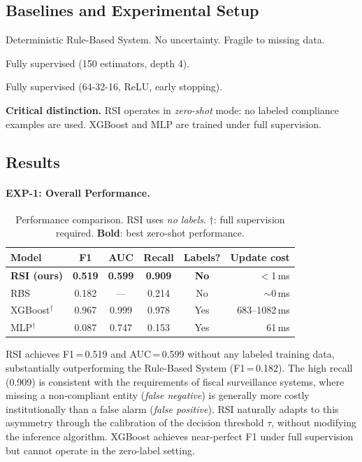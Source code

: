 \documentclass[letterpaper]{article}
\begin{document}
\subsection{Baselines and Experimental Setup}

\begin{description}[leftmargin=1.5em]
  \item[RBS] Deterministic Rule-Based System. No uncertainty.
        Fragile to missing data.
  \item[XGBoost] \citep{chen2016xgboost} Fully supervised
        (150 estimators, depth 4).
  \item[MLP] Fully supervised (64-32-16, ReLU, early stopping).
\end{description}

\noindent\textbf{Critical distinction.} RSI operates in
\emph{zero-shot} mode: no labeled compliance examples are used.
XGBoost and MLP are trained under full supervision.

\subsection{Results}

\paragraph{EXP-1: Overall Performance.}

\begin{table}[H]
\centering
\caption{Performance comparison. RSI uses \emph{no labels}.
         $\dagger$: full supervision required.
         \textbf{Bold}: best zero-shot performance.}
\label{tab:main}
\renewcommand{\arraystretch}{1.2}
\begin{tabular}{lccccr}
\toprule
\textbf{Model} & \textbf{F1} & \textbf{AUC} & \textbf{Recall}
  & \textbf{Labels?} & \textbf{Update cost} \\
\midrule
\textbf{RSI (ours)} & \textbf{0.519} & \textbf{0.599} & \textbf{0.909}
  & \textbf{No} & $<$1\,ms \\
RBS & 0.182 & --- & 0.214 & No & $\sim$0\,ms \\
XGBoost$^\dagger$ & 0.967 & 0.999 & 0.978 & Yes & 683--1082\,ms \\
MLP$^\dagger$ & 0.087 & 0.747 & 0.153 & Yes & 61\,ms \\
\bottomrule
\end{tabular}
\end{table}

RSI achieves F1\,=\,0.519 and AUC\,=\,0.599 without any labeled
training data, substantially outperforming the Rule-Based System
(F1\,=\,0.182). The high recall (0.909) is consistent with the
requirements of fiscal surveillance systems, where missing a
non-compliant entity (\emph{false negative}) is generally more
costly institutionally than a false alarm (\emph{false positive}).
RSI naturally adapts to this asymmetry through the calibration of
the decision threshold $\tau$, without modifying the inference
algorithm. XGBoost achieves near-perfect F1 under full supervision
but cannot operate in the zero-label setting.
\end{document}
